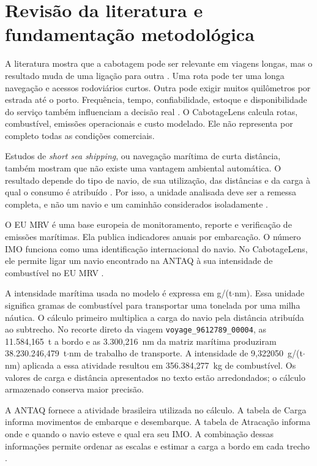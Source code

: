 \documentclass[12pt,a4paper]{article}
\begin{document}
\section{Revisão da literatura e fundamentação \mbox{metodológica}}
\label{sec:contexto}

A literatura mostra que a cabotagem pode ser relevante em viagens longas, mas o resultado muda de uma ligação para outra \cite{icct2022}. Uma rota pode ter uma longa navegação e acessos rodoviários curtos. Outra pode exigir muitos quilômetros por estrada até o porto. Frequência, tempo, confiabilidade, estoque e disponibilidade do serviço também influenciam a decisão real \cite{competitiveness2024}. O CabotageLens calcula rotas, combustível, emissões operacionais e custo modelado. Ele não representa por completo todas as condições comerciais.

Estudos de \textit{short sea shipping}, ou navegação marítima de curta distância, também mostram que não existe uma vantagem ambiental automática. O resultado depende do tipo de navio, de sua utilização, das distâncias e da carga à qual o consumo é atribuído \cite{shortsea2019}. Por isso, a unidade analisada deve ser a remessa completa, e não um navio e um caminhão considerados isoladamente \cite{modalshiftreview2020}.

O EU MRV é uma base europeia de monitoramento, reporte e verificação de emissões marítimas. Ela publica indicadores anuais por embarcação. O número IMO funciona como uma identificação internacional do navio. No CabotageLens, ele permite ligar um navio encontrado na ANTAQ à sua intensidade de combustível no EU MRV \cite{eumrv2025}.

A intensidade marítima usada no modelo é expressa em g/(t$\cdot$nm). Essa unidade significa gramas de combustível para transportar uma tonelada por uma milha náutica. O cálculo primeiro multiplica a carga do navio pela distância atribuída ao subtrecho. No recorte direto da viagem \texttt{voyage\_9612789\_00004}, as 11.584,165~t a bordo e as 3.300,216~nm da matriz marítima produziram 38.230.246,479~t$\cdot$nm de trabalho de transporte. A intensidade de 9,322050~g/(t$\cdot$nm) aplicada a essa atividade resultou em 356.384,277~kg de combustível. Os valores de carga e distância apresentados no texto estão arredondados; o cálculo armazenado conserva maior precisão.

A ANTAQ fornece a atividade brasileira utilizada no cálculo. A tabela de Carga informa movimentos de embarque e desembarque. A tabela de Atracação informa onde e quando o navio esteve e qual era seu IMO. A combinação dessas informações permite ordenar as escalas e estimar a carga a bordo em cada trecho \cite{antaq2025}.
\end{document}
